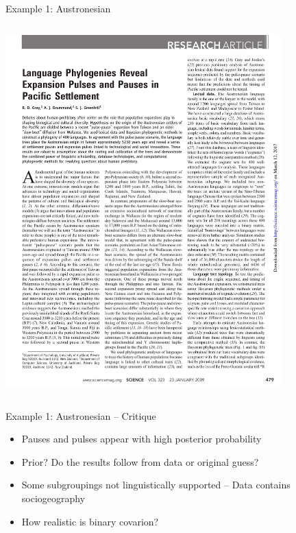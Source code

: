 \documentclass[9pt]{beamer}
\begin{document}
\begin{frame}{Example 1: Austronesian}
\begin{columns}
\begin{column}{0.5\textwidth}
        \includegraphics[width=0.8\textwidth,page=3,trim={1cm 1cm 7.5cm 16cm},clip]{austronesian.pdf}

    \end{column}
  \end{columns}
\end{frame}
\begin{frame}{Example 1: Austronesian – Critique}
  \begin{itemize}
  \item Pauses and pulses appear with high posterior probability
  \item Prior? Do the results follow from data or original guess?
  \item Some subgroupings not linguistically supported – Data contains sociogeography
  \item How realistic is binary covarion?
  \end{itemize}
\end{frame}
\end{document}
